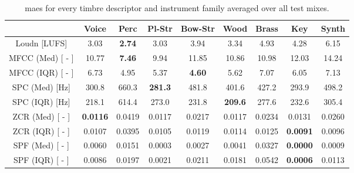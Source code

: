 \begin{table}[]
	\centering
	\begin{tabular}{c|c|c|c|c|c|c|c|c}
		                & Voice  & Perc   & Pl-Str & Bow-Str& Wood   & Brass  & Key    & Synth \\ \hline
		Loudn [LUFS]    & 3.03   & \textbf{2.74}   & 3.03   & 3.94   & 3.34   & 4.93   & 4.28   & 6.15\\ \hline
		MFCC (Med) [ - ]& 10.77  & \textbf{7.46}   & 9.94   & 11.85  & 10.86  & 10.98  & 12.03  & 14.24\\ \hline
		MFCC (IQR) [ - ]& 6.73   & 4.95   & 5.37   & \textbf{4.60}   & 5.62   & 7.07   & 6.05   & 7.13\\ \hline
		SPC (Med) [Hz]	& 300.8  & 660.3  & \textbf{281.3}  & 481.8  & 401.6  & 427.2  & 293.9  & 498.2\\ \hline
		SPC (IQR) [Hz]	& 218.1  & 614.4  & 273.0  & 231.8  & \textbf{209.6}  & 277.6  & 232.6  & 305.4 \\ \hline
		ZCR (Med) [ - ] & \textbf{0.0116} & 0.0419 & 0.0117 & 0.0217 & 0.0117 & 0.0234 & 0.0131 & 0.0260\\ \hline
		ZCR (IQR) [ - ] & 0.0107 & 0.0395 & 0.0105 & 0.0119 & 0.0114 & 0.0125 & \textbf{0.0091} & 0.0096\\ \hline
		SPF (Med) [ - ] & 0.0060 & 0.0151 & 0.0003 & 0.0027 & 0.0041 & 0.0327 & \textbf{0.0000} & 0.0009\\ \hline
		SPF (IQR) [ - ] & 0.0086 & 0.0197 & 0.0021 & 0.0211 & 0.0181 & 0.0542 & \textbf{0.0006} & 0.0113\\
	\end{tabular}
	\caption{\Glspl{mae} for every timbre descriptor and instrument family averaged over all test mixes.}
	\label{tab:feat-pred-mae-fam}
\end{table}
